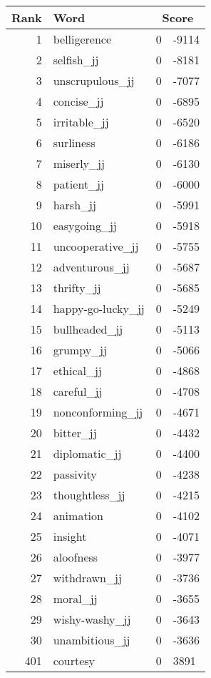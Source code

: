 \begin{longtable}[!htbp]{| rlr@{.}l |}
    \hline
    \textbf{Rank} & \textbf{Word} & \multicolumn{2}{c|}{\textbf{Score}} \\
    \hline
    \endhead
    1 & belligerence & 0 & -9114 \\
    2 & selfish\_jj & 0 & -8181 \\
    3 & unscrupulous\_jj & 0 & -7077 \\
    4 & concise\_jj & 0 & -6895 \\
    5 & irritable\_jj & 0 & -6520 \\
    6 & surliness & 0 & -6186 \\
    7 & miserly\_jj & 0 & -6130 \\
    8 & patient\_jj & 0 & -6000 \\
    9 & harsh\_jj & 0 & -5991 \\
    10 & easygoing\_jj & 0 & -5918 \\
    11 & uncooperative\_jj & 0 & -5755 \\
    12 & adventurous\_jj & 0 & -5687 \\
    13 & thrifty\_jj & 0 & -5685 \\
    14 & happy-go-lucky\_jj & 0 & -5249 \\
    15 & bullheaded\_jj & 0 & -5113 \\
    16 & grumpy\_jj & 0 & -5066 \\
    17 & ethical\_jj & 0 & -4868 \\
    18 & careful\_jj & 0 & -4708 \\
    19 & nonconforming\_jj & 0 & -4671 \\
    20 & bitter\_jj & 0 & -4432 \\
    21 & diplomatic\_jj & 0 & -4400 \\
    22 & passivity & 0 & -4238 \\
    23 & thoughtless\_jj & 0 & -4215 \\
    24 & animation & 0 & -4102 \\
    25 & insight & 0 & -4071 \\
    26 & aloofness & 0 & -3977 \\
    27 & withdrawn\_jj & 0 & -3736 \\
    28 & moral\_jj & 0 & -3655 \\
    29 & wishy-washy\_jj & 0 & -3643 \\
    30 & unambitious\_jj & 0 & -3636 \\
    401 & courtesy & 0 & 3891 \\

\end{longtable}
